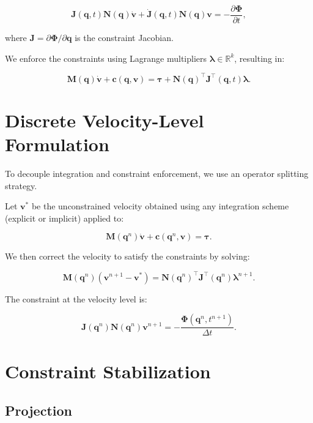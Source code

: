 \documentclass{article}
\begin{document}
\begin{equation}
    \bm{J}(\bm{q}, t) \bm{N}(\bm{q}) \dot{\bm{v}} + \dot{\bm{J}}(\bm{q}, t) \bm{N}(\bm{q}) \bm{v} = -\frac{\partial \bm{\Phi}}{\partial t},
\end{equation}

where \( \bm{J} = \partial \bm{\Phi} / \partial \bm{q} \) is the constraint
Jacobian.

We enforce the constraints using Lagrange multipliers \( \bm{\lambda} \in
\mathbb{R}^k \), resulting in:

\begin{equation}
    \bm{M}(\bm{q}) \dot{\bm{v}} + \bm{c}(\bm{q}, \bm{v}) = \bm{\tau} + \bm{N}(\bm{q})^\top \bm{J}^\top(\bm{q}, t) \bm{\lambda}.
\end{equation}

\section{Discrete Velocity-Level Formulation}

To decouple integration and constraint enforcement, we use an operator splitting
strategy.

Let \( \bm{v}^* \) be the unconstrained velocity obtained using any integration
scheme (explicit or implicit) applied to:

\begin{equation}
    \bm{M}(\bm{q}^n) \dot{\bm{v}} + \bm{c}(\bm{q}^n, \bm{v}) = \bm{\tau}.
\end{equation}

We then correct the velocity to satisfy the constraints by solving:

\begin{equation}
    \bm{M}(\bm{q}^n)(\bm{v}^{n+1} - \bm{v}^*) = \bm{N}(\bm{q}^n)^\top \bm{J}^\top(\bm{q}^n) \bm{\lambda}^{n+1}.
\end{equation}

The constraint at the velocity level is:

\begin{equation}
    \bm{J}(\bm{q}^n) \bm{N}(\bm{q}^n) \bm{v}^{n+1} = -\frac{\bm{\Phi}(\bm{q}^n, t^{n+1})}{\Delta t}.
\end{equation}

\section{Constraint Stabilization}

\subsection{Projection}
\end{document}
